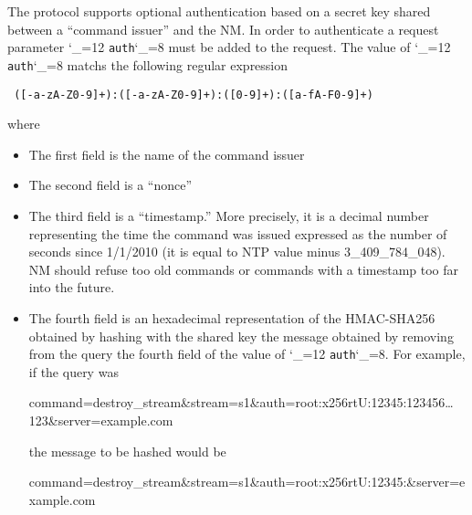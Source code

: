 \documentclass[a4paper,10pt]{medusabook}
\def\ttt{\catcode`\_=12 \tttii}
\def\tttii#1!{{\tt #1}\catcode`\_=8{}}
\begin{document}
The protocol supports optional authentication based on a secret key
shared between a ``command issuer'' and the NM.  In order to
authenticate a request parameter \ttt auth! must be added to the
request.  The value of \ttt auth! matchs the following regular
expression

\begin{center}
\tt
([-a-zA-Z0-9]+):([-a-zA-Z0-9]+):([0-9]+):([a-fA-F0-9]+)
\end{center}

where
\begin{itemize}
\item
The first field is the name of the command issuer
\item
The second field is a ``nonce''
\item
The third field is a ``timestamp.''  More precisely, it is a decimal
number representing the time the command was issued expressed as the
number of seconds since 1/1/2010 (it is equal to NTP value minus
3\_409\_784\_048).  NM should refuse too old commands or commands with a
timestamp too far into the future.
\item
The fourth field is an hexadecimal representation of the HMAC-SHA256
obtained by hashing with the shared key the message obtained by
removing from the query the fourth field of the value of \ttt auth!.
For example, if the query was

\begin{center}
\small
command=destroy\_stream\&stream=s1\&auth=root:x256rtU:12345:123456\ldots123\&server=example.com
\end{center}

the message to be hashed would be
\begin{center}
\small
command=destroy\_stream\&stream=s1\&auth=root:x256rtU:12345:\&server=example.com
\end{center}
\end{itemize}



\end{document}

